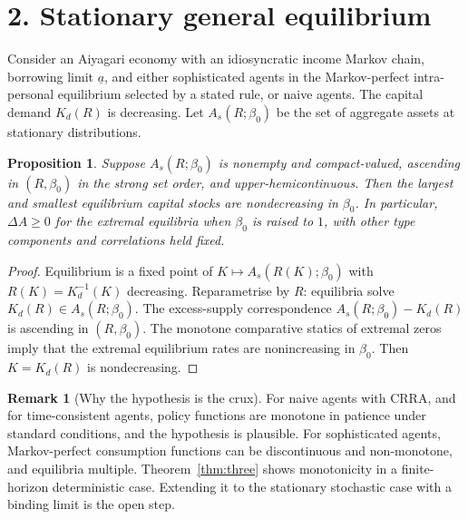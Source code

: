 \documentclass[11pt]{article}
\newtheorem{proposition}[theorem]{Proposition}
\theoremstyle{definition}
\newtheorem{remark}[theorem]{Remark}
\begin{document}
\section*{2. Stationary general equilibrium}
Consider an Aiyagari economy with an idiosyncratic income Markov chain, borrowing limit $\underline a$, and either
sophisticated agents in the Markov-perfect intra-personal equilibrium selected by a stated rule, or naive agents. The
capital demand $K_d(R)$ is decreasing. Let $A_s(R;\beta_0)$ be the set of aggregate assets at stationary distributions.
\begin{proposition}\label{prop:ge}
Suppose $A_s(R;\beta_0)$ is nonempty and compact-valued, ascending in $(R,\beta_0)$ in the strong set order, and
upper-hemicontinuous. Then the largest and smallest equilibrium capital stocks are nondecreasing in $\beta_0$. In particular,
$\Delta A\ge0$ for the extremal equilibria when $\beta_0$ is raised to $1$, with other type components and correlations held
fixed.
\end{proposition}
\begin{proof}
Equilibrium is a fixed point of $K\mapsto A_s(R(K);\beta_0)$ with $R(K)=K_d^{-1}(K)$ decreasing. Reparametrise by $R$:
equilibria solve $K_d(R)\in A_s(R;\beta_0)$. The excess-supply correspondence $A_s(R;\beta_0)-K_d(R)$ is ascending in
$(R,\beta_0)$. The monotone comparative statics of extremal zeros \cite{mr} imply that the extremal equilibrium rates are
nonincreasing in $\beta_0$. Then $K=K_d(R)$ is nondecreasing.
\end{proof}
\begin{remark}[Why the hypothesis is the crux]
For naive agents with CRRA, and for time-consistent agents, policy functions are monotone in patience under standard
conditions, and the hypothesis is plausible. For sophisticated agents, Markov-perfect consumption functions can be
discontinuous and non-monotone, and equilibria multiple. Theorem~\ref{thm:three} shows monotonicity in a finite-horizon
deterministic case. Extending it to the stationary stochastic case with a binding limit is the open step.
\end{remark}
\end{document}
